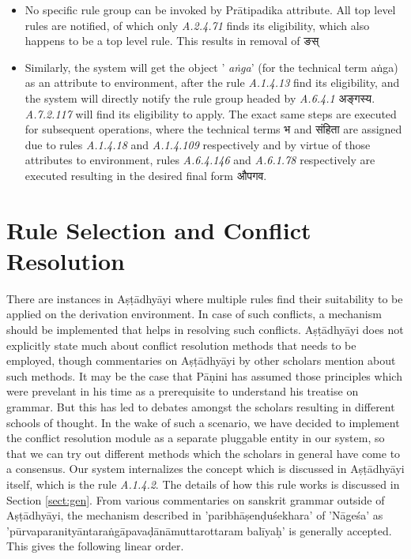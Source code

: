 \documentclass[a4paper,11pt,twoside,openright]{report}
\begin{document}
\begin{itemize}
\item No specific rule group can be invoked by Prātipadika attribute. All top level rules are notified, of which only \textsl{ A.2.4.71} finds its eligibility, which also happens to be a top level rule. This results in removal of {\skt ङस्} 

\item Similarly, the system will get the object '\textsl{ aṅga}' (for the technical term aṅga) as an attribute to environment, after the rule \textsl{ A.1.4.13} find its eligibility, and the system will directly notify the rule group headed by \textsl{ A.6.4.1} {\skt अङ्गस्य}. \textsl{ A.7.2.117} will find its eligibility to apply.  The exact same steps are executed for subsequent operations, where the technical terms {\skt भ and संहिता } are assigned due to  rules \textsl{ A.1.4.18} and \textsl{ A.1.4.109} respectively and by virtue of those attributes to environment, rules \textsl{ A.6.4.146} and \textsl{ A.6.1.78} respectively are executed resulting in the desired final form {\skt औपगव}.

\end{itemize}


\section{Rule Selection and Conflict Resolution}
\label{sect:confRes}

There are instances in Aṣṭādhyāyi where multiple rules find their suitability to be applied on the derivation environment. In case of such conflicts, a mechanism should be implemented that helps in resolving such conflicts. Aṣṭādhyāyi does not explicitly state much about conflict resolution methods that needs to be employed, though commentaries on Aṣṭādhyāyi by other scholars mention about such methods. It may be the case that Pāṇini has assumed those principles which were prevelant in his time as a prerequisite to understand his treatise on grammar. But this has led to debates amongst the scholars resulting in different schools of thought. In the wake of such a scenario, we have decided to implement the conflict resolution module as a separate pluggable entity in our system, so that we can try out different methods which the scholars in general have come to a consensus. Our system internalizes the concept which is discussed in Aṣṭādhyāyi itself, which is the rule \textsl{ A.1.4.2}. The details of how this rule works is discussed in Section \ref{sect:gen}. From various commentaries on sanskrit grammar outside of Aṣṭādhyāyi, the mechanism described in 'paribhāṣenḍuśekhara' of 'Nāgeśa' as 'pūrvaparanityāntaraṅgāpavaḍānāmuttarottaram balīyaḥ' is generally accepted. This gives the following linear order.
\\ \\
\noindent{}
\end{document}
